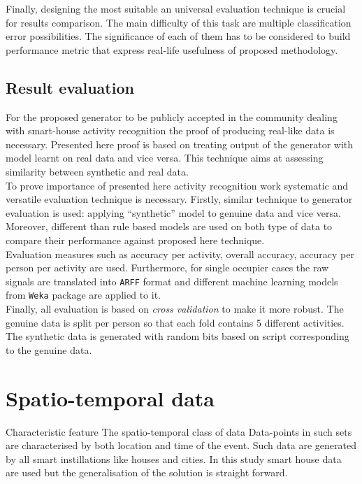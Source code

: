 \documentclass[12pt, a4paper, pdflatex, leqno, twoside, openright]{report}
\begin{document}
Finally, designing the most suitable an universal evaluation technique is crucial for results comparison. The main difficulty of this task are multiple classification error possibilities. The significance of each of them has to be considered to build performance metric that express real-life usefulness of proposed methodology.

\section{Result evaluation}
For the proposed generator to be publicly accepted in the community dealing with smart-house activity recognition the proof of producing real-like data is necessary. Presented here proof is based on treating output of the generator with model learnt on real data and vice versa. This technique aims at assessing similarity between synthetic and real data.\\

To prove importance of presented here activity recognition work systematic and versatile evaluation technique is necessary. Firstly, similar technique to generator evaluation is used: applying ``synthetic'' model to genuine data and vice versa. Moreover, different than rule based models are used on both type of data to compare their performance against proposed here technique.\\
Evaluation measures such as accuracy per activity, overall accuracy, accuracy per person per activity are used. Furthermore, for single occupier cases the raw signals are translated into \texttt{ARFF} format and different machine learning models from \texttt{Weka} package are applied to it.\\
Finally, all evaluation is based on \emph{cross validation} to make it more robust. The genuine data is split per person so that each fold contains 5 different activities. The synthetic data is generated with random bits based on script corresponding to the genuine data.


\chapter{Spatio-temporal data\label{ch:stData}}
Characteristic feature The spatio-temporal class of data  Data-points in such sets are characterised by both location and time of the event. Such data are generated by all smart instillations like houses and cities. In this study smart house data are used but the generalisation of the solution is straight forward.\\ %
\end{document}
